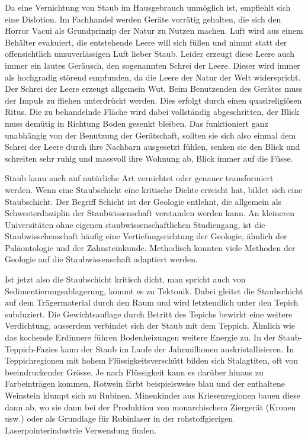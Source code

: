 Da eine Vernichtung von Staub im Hausgebrauch unmöglich ist, empfiehlt sich eine Dislotion. Im Fachhandel werden Geräte vorrätig gehalten, die sich den Horror Vacui als Grundprinzip der Natur zu Nutzen machen. Luft wird aus einem Behälter evakuiert, die entstehende Leere will sich füllen und nimmt statt der offensichtlich unzuverlässigen Luft lieber Staub. Leider erzeugt diese Leere auch immer ein lautes Geräusch, den sogenannten Schrei der Leere. Dieser wird immer als hochgradig störend empfunden, da die Leere der Natur der Welt widerspricht. Der Schrei der Leere erzeugt allgemein Wut. Beim Benutzenden des Gerätes muss der Impuls zu fliehen unterdrückt werden. Dies erfolgt durch einen quasireligiösen Ritus. Die zu behandelnde Fläche wird dabei vollständig abgeschritten, der Blick muss demütig in Richtung Boden gesenkt bleiben. Das funktioniert ganz unabhängig von der Benutzung der Gerätschaft, sollten sie sich also einmal dem Schrei der Leere durch ihre Nachbarn ausgesetzt fühlen, senken sie den Blick und schreiten sehr ruhig und massvoll ihre Wohnung ab, Blick immer auf die Füsse.

Staub kann auch auf natürliche Art vernichtet oder genauer transformiert werden. Wenn eine Staubschicht eine kritische Dichte erreicht hat, bildet sich eine Staubschicht. Der Begriff Schicht ist der Geologie entlehnt, die allgemein als Schwesterdisziplin der Staubwissenschaft verstanden werden kann. An kleineren Universitäten ohne eigenen staubwissenschaftlichen Studiengang, ist die Staubwisschenschaft häufig eine Vertiefungsrichtung der Geologie, ähnlich der Paläontologie und der Zahnsteinkunde. Methodisch konnten viele Methoden der Geologie auf die Staubwissenschaft adaptiert werden.

Ist jetzt also die Staubschicht kritisch dicht, man spricht auch von Sedimentierungsablagerung, kommt es zu Tektonik. Dabei gleitet die Staubschicht auf dem Trägermaterial durch den Raum und wird letztendlich unter den Tepich subduziert. Die Gewichtsauflage durch Betritt des Tepichs bewirkt eine weitere Verdichtung, ausserdem verbindet sich der Staub mit dem Teppich. Ähnlich wie das kochende Erdinnere führen Bodenheizungen weitere Energie zu. In der Staub-Teppich-Fazies kann der Staub im Laufe der Jahrmillionen auskristallisieren. In Teppichregionen mit hohem Flüssigkeitsverschütt bilden sich Stalagtiten, oft von beeindruckender Grösse. Je nach Flüssigkeit kann es darüber hinaus zu Farbeinträgen kommen, Rotwein färbt beispielsweise blau und der enthaltene Weinstein klumpt sich zu Rubinen. Minenkinder aus Kriesenregionen bauen diese dann ab, wo sie dann bei der Produktion von monarchischem Ziergerät (Kronen usw.) oder als Grundlage für Rubinlaser in der rohstoffgierigen Laserpointerindustrie Verwendung finden.

